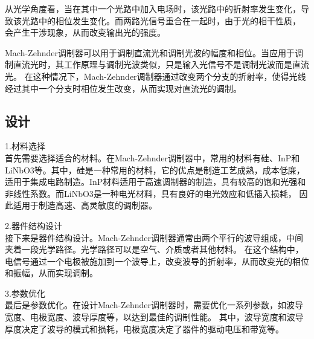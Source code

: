 \documentclass[12pt, a4paper, oneside]{article}
\begin{document}
\begin{spacing}{2.0}
从光学角度看，当在其中一个光路中加入电场时，该光路中的折射率发生变化，导致该光路中的相位发生变化。而两路光信号重合在一起时，由于光的相干性质，
会产生干涉现象，从而改变输出光的强度。

Mach-Zehnder调制器可以用于调制直流光和调制光波的幅度和相位。当应用于调制直流光时，其工作原理与调制光波类似，只是输入光信号不是调制光波而是直流光。
在这种情况下，Mach-Zehnder调制器通过改变两个分支的折射率，使得光线经过其中一个分支时相位发生改变，从而实现对直流光的调制。
\subsection{设计}
1.材料选择\\
首先需要选择适合的材料。在Mach-Zehnder调制器中，常用的材料有硅、InP和LiNbO3等。其中，硅是一种常用的材料，它的优点是制造工艺成熟，成本低廉，
适用于集成电路制造。InP材料适用于高速调制器的制造，具有较高的饱和光强和非线性系数。而LiNbO3是一种电光材料，具有良好的电光效应和低插入损耗，
因此适用于制造高速、高灵敏度的调制器。

2.器件结构设计\\
接下来是器件结构设计。Mach-Zehnder调制器通常由两个平行的波导组成，中间夹着一段光学路径。光学路径可以是空气、介质或者其他材料。
在这个结构中，电信号通过一个电极被施加到一个波导上，改变波导的折射率，从而改变光的相位和振幅，从而实现调制。

3.参数优化\\
最后是参数优化。在设计Mach-Zehnder调制器时，需要优化一系列参数，如波导宽度、电极宽度、波导厚度等，以达到最佳的调制性能。
其中，波导宽度和波导厚度决定了波导的模式和损耗，电极宽度决定了器件的驱动电压和带宽等。












\end{spacing}{}


\end{document}
